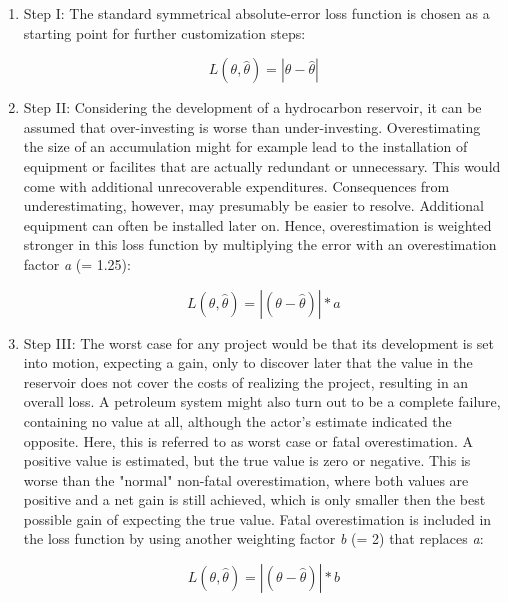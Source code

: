 		\begin{enumerate}
			\item Step I: The standard symmetrical absolute-error loss function is chosen as a starting point for further customization steps:
			
			\begin{equation}
			L(\theta,\hat{\theta}) = |\theta - \hat{\theta}|
			\end{equation}  
			
			\item Step II: Considering the development of a hydrocarbon reservoir, it can be assumed that over-investing is worse than under-investing. Overestimating the size of an accumulation might for example lead to the installation of equipment or facilites that are actually redundant or unnecessary. This would come with additional unrecoverable expenditures. Consequences from underestimating, however, may presumably be easier to resolve. Additional equipment can often be installed later on. Hence, overestimation is weighted stronger in this loss function by multiplying the error with an overestimation factor \textit{a} (= 1.25):
			
			\begin{equation}\label{eq:LF_II}
			L(\theta,\hat{\theta}) = |(\theta-\hat{\theta})|*a
			\end{equation}
			
			\item Step III: The worst case for any project would be that its development is set into motion, expecting a gain, only to discover later that the value in the reservoir does not cover the costs of realizing the project, resulting in an overall loss. A petroleum system might also turn out to be a complete failure, containing no value at all, although the actor's estimate indicated the opposite. Here, this is referred to as worst case or fatal overestimation. A positive value is estimated, but the true value is zero or negative. This is worse than the "normal" non-fatal overestimation, where both values are positive and a net gain is still achieved, which is only smaller then the best possible gain of expecting the true value. Fatal overestimation is included in the loss function by using another weighting factor \textit{b} (= 2) that replaces \textit{a}:
			
			\begin{equation}\label{eq:LF_III}
			L(\theta,\hat{\theta}) = |(\theta-\hat{\theta})|*b
			\end{equation}
			

\end{enumerate}
